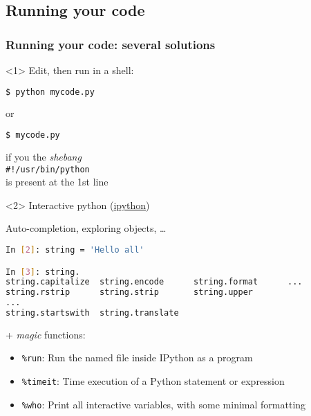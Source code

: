 %
%
%

\subsection{Running your code}
\begin{frame}[fragile, c]
\frametitle{Running your code: several solutions}

\begin{onlyenv}<1> 
Edit, then run in a shell:
\begin{lstlisting}[language=bash]
$ python mycode.py
\end{lstlisting}
or 
\begin{lstlisting}[language=bash]
$ mycode.py
\end{lstlisting}
if you the \textit{shebang}\\
 \verb|#!/usr/bin/python| \\
 is present at the 1st line
\end{onlyenv}

\begin{onlyenv}<2> 
Interactive python (\href{http://ipython.org/}{ipython})

Auto-completion, exploring objects, \ldots

\begin{lstlisting}[language=bash]
In [2]: string = 'Hello all'

In [3]: string.
string.capitalize  string.encode      string.format      ...
string.rstrip      string.strip       string.upper       
... 
string.startswith  string.translate   
\end{lstlisting}

+ \textit{magic} functions:

{\footnotesize
\begin{itemize}
\item[] \verb|%run|: Run the named file inside IPython as a program\\
\item[] \verb|%timeit|: Time execution of a Python statement or expression\\
\item[] \verb|%who|: Print all interactive variables, with some minimal formatting
\end{itemize}
}
\vfill


\end{onlyenv}
\end{frame}
